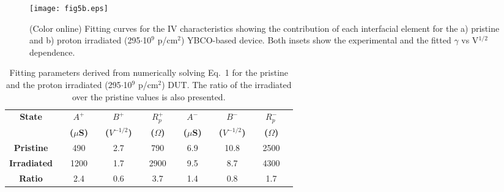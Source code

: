 \documentclass[square,aip,preprint,showkeys,superscriptaddress]{revtex4}
\begin{document}
\begin{figure} [htb]
	\vspace{0mm}
	\centerline{\texttt{[image: fig5b.eps]}}
	\vspace{-2mm}\caption{(Color online) Fitting curves for the IV characteristics showing the contribution of each interfacial element for the a) pristine and b) proton irradiated (295$\cdot$10$^{9}$ p/cm$^2$) YBCO-based device. Both insets show the experimental and the fitted $\gamma$ vs V$^{1/2}$ dependence.} 
	\vspace{-0mm}
	\label{fig:IVexpysim}
\end{figure}




\begin{table}[h]
	\caption{Fitting parameters derived from numerically solving
		Eq.~1 for the pristine and the proton irradiated (295$\cdot$10$^{9}$ p/cm$^2$) DUT. The ratio of the irradiated over the pristine values is also presented.}
	\vspace{0.4cm}
	\label{tab:ajustes}
	\begin{tabular}{||c||ccc|cc|cc|cc|cc|cc||}
		\hline  \hline
		\textbf{State}      && \large{$A^{+}$} && \large{$B^{+}$} && \large{$R_p^+$}  && \large{$A^-$} && \large{$B^{-}$} && \large{$R_p^-$}  & \vspace{-2mm}\\
		&& \textbf{($\mu$S)} && \textbf{($V^{-1/2}$)} && \textbf{($\Omega$)}  && \textbf{($\mu$S)} && \textbf{($V^{-1/2}$)} && \textbf{($\Omega$)} & \\ \hline \hline
		\textbf{Pristine} & &      490     & &    2.7    & &    790      & &  6.9 && 10.8 && 2500  &        \\
		\textbf{Irradiated} & &     1200    & &    1.7      & &     2900       & &    9.5  &&  8.7 && 4300 &  \\
		\textbf{Ratio} & &     2.4    & &    0.6      & &     3.7       & &    1.4  &&  0.8 && 1.7 &       \\ \hline \hline
	\end{tabular}
\end{table}
\end{document}
